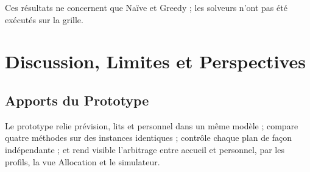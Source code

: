 Ces résultats ne concernent que Naïve et Greedy ; les solveurs n'ont pas été exécutés sur la grille.

\section{Discussion, Limites et Perspectives}

\subsection{Apports du Prototype}
Le prototype relie prévision, lits et personnel dans un même modèle ; compare quatre méthodes sur des instances identiques ; contrôle chaque plan de façon indépendante ; et rend visible l'arbitrage entre accueil et personnel, par les profils, la vue Allocation et le simulateur.

